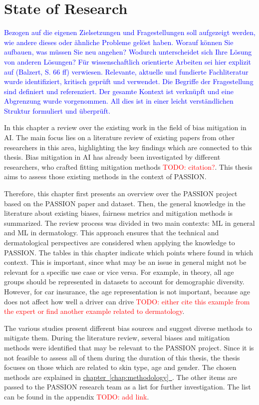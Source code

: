 \documentclass[12pt, a4paper, oneside]{book}   	%
\renewcommand{\todo}[1]{\textcolor{red}{TODO: #1}}
\newcommand{\linkchap}[1]{\hyperref[#1]{chapter~\ref{#1}~\nameref{#1}}}
\newcommand{\baaCriteria}[1]{\textcolor{blue}{#1}}
\begin{document}
	\chapter{State of Research}
		\baaCriteria{Bezogen auf die eigenen Zielsetzungen und Fragestellungen soll aufgezeigt werden, wie andere dieses oder ähnliche Probleme gelöst haben. Worauf können Sie aufbauen, was müssen Sie neu angehen?	Wodurch unterscheidet sich Ihre Lösung von anderen Lösungen? Für wissenschaftlich orientierte Arbeiten sei hier explizit auf (Balzert, S. 66 ff) verwiesen.}
		\baaCriteria{Relevante, aktuelle und fundierte Fachliteratur wurde identifiziert, kritisch geprüft und verwendet. Die Begriffe der Fragestellung sind definiert und referenziert. Der gesamte Kontext ist verknüpft und eine Abgrenzung wurde vorgenommen. All dies ist in einer leicht verständlichen Struktur formuliert und überprüft.}
		
		In this chapter a review over the existing work in the field of bias mitigation in \gls{AI}. The main focus lies on a literature review of existing papers from other researchers in this area, highlighting the key findings which are connected to this thesis. Bias mitigation in \gls{AI} has already been investigated by different researchers, who crafted fitting mitigation methods \todo{citation?}. This thesis aims to assess those existing methods in the context of PASSION.
		
		Therefore, this chapter first presents an overview over the PASSION project based on the PASSION paper and dataset. Then, the general knowledge in the literature about existing biases, fairness metrics and mitigation methods is summarized. The review process was divided in two main contexts: \gls{ML} in general and \gls{ML} in dermatology. This approach ensures that the technical and dermatological perspectives are considered when applying the knowledge to PASSION. The tables in this chapter indicate which points where found in which context. This is important, since what may be an issue in general might not be relevant for a specific use case or vice versa. For example, in theory, all age groups should be represented in datasets to account for demographic diversity. However, for car insurance, the age representation is not important, because age does not affect how well a driver can drive \todo{either cite this example from the expert or find another example related to dermatology}.
		
		The various studies present different bias sources and suggest diverse methods to mitigate them. During the literature review, several biases and mitigation methods were identified that may be relevant to the PASSION project. Since it is not feasible to assess all of them during the duration of this thesis, the thesis focuses on those which are related to skin type, age and gender. The chosen methods are explained in \linkchap{chap:methodology}. The other items are passed to the PASSION research team as a list for further investigation. The list can be found in the appendix \todo{add link}.
		
\end{document}

